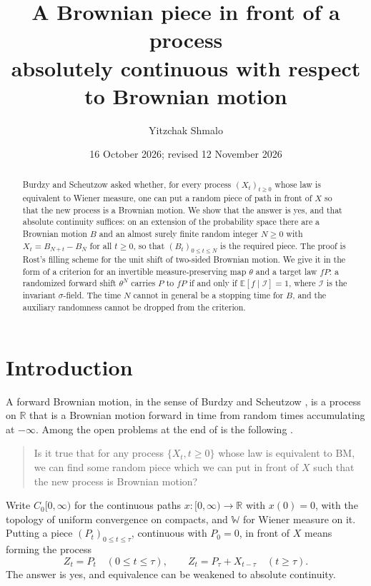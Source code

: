 \documentclass[11pt]{amsart}
\title[A Brownian piece in front of a process]{A Brownian piece in front of a process\\ absolutely continuous with respect to Brownian motion}
\author{Yitzchak Shmalo}
\date{16 October 2026; revised 12 November 2026}
\theoremstyle{remark}
\numberwithin{equation}{section}
\newcommand{\E}{\mathbb E}
\newcommand{\R}{\mathbb R}
\newcommand{\I}{\mathcal I}
\newcommand{\Wi}{\mathbb W}
\begin{document}
\begin{abstract}
Burdzy and Scheutzow asked whether, for every process $(X_t)_{t\ge0}$ whose law is equivalent to Wiener measure, one can put a random piece of path in front of $X$ so that the new process is a Brownian motion. We show that the answer is yes, and that absolute continuity suffices: on an extension of the probability space there are a Brownian motion $B$ and an almost surely finite random integer $N\ge0$ with $X_t=B_{N+t}-B_N$ for all $t\ge0$, so that $(B_t)_{0\le t\le N}$ is the required piece. The proof is Rost's filling scheme for the unit shift of two-sided Brownian motion. We give it in the form of a criterion for an invertible measure-preserving map $\theta$ and a target law $fP$: a randomized forward shift $\theta^N$ carries $P$ to $fP$ if and only if $\E[f\mid\I]=1$, where $\I$ is the invariant $\sigma$-field. The time $N$ cannot in general be a stopping time for $B$, and the auxiliary randomness cannot be dropped from the criterion.
\end{abstract}
\maketitle

\section{Introduction}\label{sec:intro}

A forward Brownian motion, in the sense of Burdzy and Scheutzow \cite{BS}, is a process on $\R$ that is a Brownian motion forward in time from random times accumulating at $-\infty$. Among the open problems at the end of \cite{BS} is the following \cite[Problem~7.5, p.~125]{BS}.

\begin{quote}
Is it true that for any process $\{X_t, t\ge0\}$ whose law is equivalent to BM, we can find some random piece which we can put in front of $X$ such that the new process is Brownian motion?
\end{quote}

Write $C_0[0,\infty)$ for the continuous paths $x:[0,\infty)\to\R$ with $x(0)=0$, with the topology of uniform convergence on compacts, and $\Wi$ for Wiener measure on it. Putting a piece $(P_t)_{0\le t\le\tau}$, continuous with $P_0=0$, in front of $X$ means forming the process
\begin{equation}\label{eq:concat}
Z_t=P_t\quad(0\le t\le\tau),\qquad Z_t=P_\tau+X_{t-\tau}\quad(t\ge\tau).
\end{equation}
The answer is yes, and equivalence can be weakened to absolute continuity.
\end{document}
